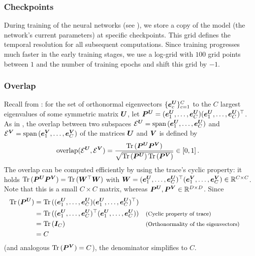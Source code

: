 \subsubsection{Checkpoints}

During training of the neural networks (see
), we store a copy of the model (\ie the network's
current parameters) at specific checkpoints. This grid defines the temporal
resolution for all subsequent computations. Since training progresses much
faster in the early training stages, we use a log-grid with $100$ grid points
between $1$ and the number of training epochs and shift this grid by $-1$.

\subsubsection{Overlap}

Recall from : for the set of orthonormal
eigenvectors $\{ {\bm{e}}_c^{\bm{U}} \}_{c=1}^C$ to the $C$ largest eigenvalues of some
symmetric matrix ${\bm{U}}$, let ${\bm{P}}^{\bm{U}} = ({\bm{e}}_1^{\bm{U}}, \dots, {\bm{e}}_C^{\bm{U}}) ({\bm{e}}_1^{\bm{U}},
\dots, {\bm{e}}_C^{\bm{U}})^\top$. As in \cite{gurari2018gradient}, the overlap between two
subspaces $\mathcal{E}^{\bm{U}} = \operatorname{span}{}({\bm{e}}_1^{\bm{U}}, \dots, {\bm{e}}_C^{\bm{U}})$ and
$\mathcal{E}^{\bm{V}} = \operatorname{span}{}({\bm{e}}_1^{\bm{V}}, \dots, {\bm{e}}_C^{\bm{V}})$ of the matrices ${\bm{U}}$
and ${\bm{V}}$ is defined by
\begin{equation*}
  \text{overlap}(\mathcal{E}^{\bm{U}}, \mathcal{E}^{\bm{V}})
  = \frac{\operatorname{Tr}{}({\bm{P}}^{\bm{U}} {\bm{P}}^{\bm{V}})}
  {\sqrt{\operatorname{Tr}{}({\bm{P}}^{\bm{U}}) \operatorname{Tr}{}({\bm{P}}^{\bm{V}})}}
  \in [0, 1]\, .
\end{equation*}
%
The overlap can be computed efficiently by using the trace's cyclic property: it
holds $\operatorname{Tr}{}({\bm{P}}^{\bm{U}} {\bm{P}}^{\bm{V}}) = \operatorname{Tr}{}({\bm{W}}^\top {\bm{W}})$ with ${\bm{W}} = ({\bm{e}}_1^{\bm{U}}, \dots,
{\bm{e}}_C^{\bm{U}})^\top ({\bm{e}}_1^{\bm{V}}, \dots, {\bm{e}}_C^{\bm{V}}) \in \mathbb{R}^{C \times C}$. Note
that this is a small $C \times C$ matrix, whereas ${\bm{P}}^{\bm{U}}, {\bm{P}}^{\bm{V}} \in
\mathbb{R}^{D \times D}$. Since
\begin{align*}
  \operatorname{Tr}{}({\bm{P}}^{\bm{U}})
  & = \operatorname{Tr}{}(({\bm{e}}_1^{\bm{U}}, \dots, {\bm{e}}_C^{\bm{U}}) ({\bm{e}}_1^{\bm{U}}, \dots, {\bm{e}}_C^{\bm{U}})^\top) \\
  & = \operatorname{Tr}{}(({\bm{e}}_1^{\bm{U}}, \dots, {\bm{e}}_C^{\bm{U}})^\top ({\bm{e}}_1^{\bm{U}}, \dots, {\bm{e}}_C^{\bm{U}}))
    &&{\footnotesize\text{(Cyclic property of trace)}}                                 \\
  & = \operatorname{Tr}{}({\bm{I}}_C)
    &&{\footnotesize\text{(Orthonormality of the eigenvectors)}}                       \\
  & = C
\end{align*}
(and analogous $\operatorname{Tr}{}({\bm{P}}^{\bm{V}}) = C$), the denominator simplifies to $C$.

